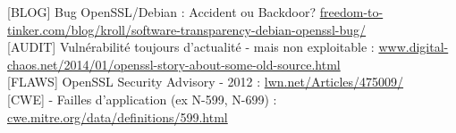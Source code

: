 \documentclass{article}
\begin{document}
		[BLOG] Bug OpenSSL/Debian : Accident ou Backdoor? \href{https://freedom-to-tinker.com/blog/kroll/software-transparency-debian-openssl-bug/}
		{freedom-to-tinker.com/blog/kroll/software-transparency-debian-openssl-bug/}\\

		[AUDIT] Vulnérabilité toujours d'actualité - mais non exploitable :		\href{http://www.digital-chaos.net/2014/01/openssl-story-about-some-old-source.html}
		{www.digital-chaos.net/2014/01/openssl-story-about-some-old-source.html}\\

		[FLAWS] OpenSSL Security Advisory - 2012 : \href{http://lwn.net/Articles/475009/}{lwn.net/Articles/475009/}\\

		[CWE] - Failles d'application (ex N-599, N-699) : \href{http://cwe.mitre.org/data/definitions/599.html}
		{cwe.mitre.org/data/definitions/599.html}

		\newpage
	

\setcounter{tocdepth}{2}
\end{document}
